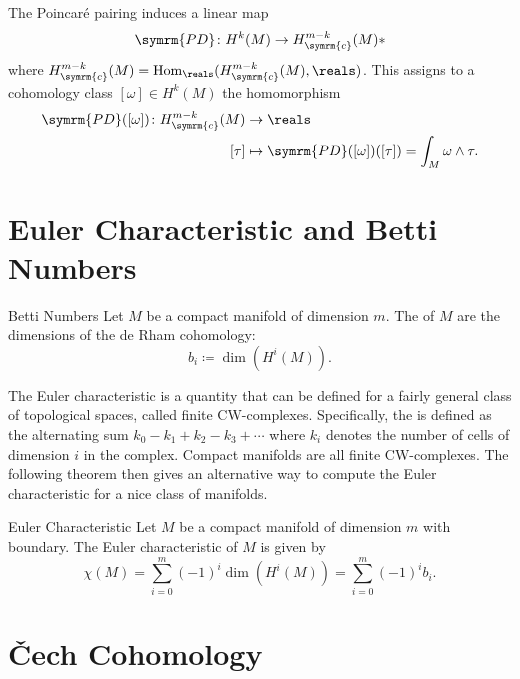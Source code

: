 \documentclass[fleqn]{NotesClass}
\DeclareMathOperator{\Hom}{Hom}
\newcommand{\compact}{\symrm{c}}
\newcommand{\poincareDuality}{\symrm{PD}}
\begin{document}
    \begin{crl}{}{}
        The Poincar\'e pairing induces a linear map
        \begin{equation}
            \poincareDuality \colon H^k(M) \to H_{\compact}^{m - k}(M)*
        \end{equation}
        where \(H_{\compact}^{m-k}(M) = \Hom_{\reals}(H_{\compact}^{m-k}(M), \reals)\).
        This assigns to a cohomology class \([\omega] \in H^k(M)\) the homomorphism
        \begin{align}
            \poincareDuality([\omega]) \colon H_{\compact}^{m - k}(M) &\to \reals\\
            [\tau] &\mapsto \poincareDuality([\omega])([\tau]) = \int_M \omega \wedge \tau.
        \end{align}
    \end{crl}
    
    \section{Euler Characteristic and Betti Numbers}
    \begin{dfn}{Betti Numbers}{}
        Let \(M\) be a compact manifold of dimension \(m\).
        The  of \(M\) are the dimensions of the de Rham cohomology:
        \begin{equation}
            b_i \coloneqq \dim (H^i(M)).
        \end{equation}
    \end{dfn}
    
    The Euler characteristic is a quantity that can be defined for a fairly general class of topological spaces, called finite CW-complexes.
    Specifically, the  is defined as the alternating sum \(k_0 - k_1 + k_2 - k_3 + \dotsb\) where \(k_i\) denotes the number of cells of dimension \(i\) in the complex.
    Compact manifolds are all finite CW-complexes.
    The following theorem then gives an alternative way to compute the Euler characteristic for a nice class of manifolds.
    
    \begin{thm}{Euler Characteristic}{}
        Let \(M\) be a compact manifold of dimension \(m\) with boundary.
        The Euler characteristic of \(M\) is given by
        \begin{equation}
            \chi(M) = \sum_{i=0}^m (-1)^i \dim(H^i(M)) = \sum_{i=0}^m (-1)^i b_i.
        \end{equation}
    \end{thm}
    
    \section{\v{C}ech Cohomology}
    
    
    
    
%        
%
	\backmatter
	\renewcommand{\glossaryname}{Acronyms}
	\printglossary[acronym]
	\printindex
\end{document}
